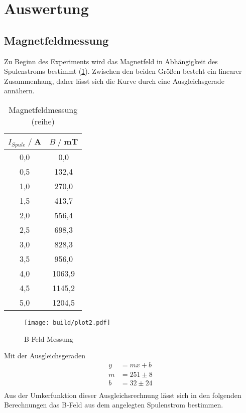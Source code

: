 \newpage
\section{Auswertung}















\subsection{Magnetfeldmessung}
Zu Beginn des Experiments wird das Magnetfeld in Abhängigkeit des Spulenstroms bestimmt (\ref{tab:Br}).
Zwischen den beiden Größen besteht ein linearer Zusammenhang, daher lässt sich die Kurve durch eine Ausgleichsgerade annähern.
\begin{table}[H]
    \centering
    \begin{tabular}{c c}
        \toprule
        $I_{Spule} \;/\;$A & $B\;/\;$mT\\
        \midrule
        0,0                 &0,0\\
        0,5                 &132,4\\
        1,0                 &270,0\\
        1,5                 &413,7\\
        2,0                 &556,4\\  
        2,5                 &698,3\\
        3,0                 &828,3\\
        3,5                 &956,0\\
        4,0                 &1063,9\\
        4,5                 &1145,2\\
        5,0                 &1204,5\\
        \bottomrule
    \end{tabular}
    \caption{Magnetfeldmessung (reihe)}
    \label{tab:Br}
\end{table}
\begin{figure}[H]
    \centering
    \texttt{[image: build/plot2.pdf]}
    \caption{B-Feld Messung}
    \label{fig:Br}
\end{figure}
Mit der Ausgleichsgeraden
\begin{align*}
    y &= mx + b\\
    m &= 251\pm 8\\  
    b &= 32\pm 24\\
\end{align*}
Aus der Umkerfunktion dieser Ausgleichsrechnung lässt sich in den folgenden Berechnungen das B-Feld aus dem angelegten Spulenstrom bestimmen.

